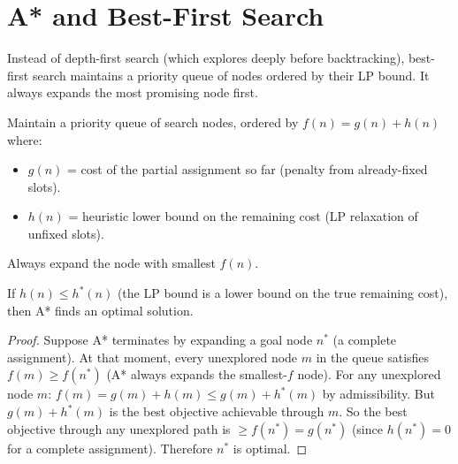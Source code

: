 \documentclass[11pt, a4paper, oneside]{book}
\begin{document}
\section{A* and Best-First Search}

Instead of depth-first search (which explores deeply before backtracking),
best-first search maintains a priority queue of nodes ordered by their LP
bound.  It always expands the most promising node first.

\begin{defbox}[title={A* for Optimisation}]
Maintain a priority queue of search nodes, ordered by
$f(n) = g(n) + h(n)$ where:
\begin{itemize}[nosep]
  \item $g(n)$ = cost of the partial assignment so far (penalty from already-fixed slots).
  \item $h(n)$ = heuristic lower bound on the remaining cost (LP relaxation of unfixed slots).
\end{itemize}
Always expand the node with smallest $f(n)$.
\end{defbox}

\begin{thmbox}[title={Admissibility of LP Heuristic}]
If $h(n) \leq h^*(n)$ (the LP bound is a lower bound on the true remaining
cost), then A* finds an optimal solution.
\end{thmbox}

\begin{proof}
Suppose A* terminates by expanding a goal node $n^*$ (a complete assignment).
At that moment, every unexplored node $m$ in the queue satisfies
$f(m) \geq f(n^*)$ (A* always expands the smallest-$f$ node).
For any unexplored node $m$: $f(m) = g(m) + h(m) \leq g(m) + h^*(m)$
by admissibility.  But $g(m) + h^*(m)$ is the best objective achievable
through $m$.  So the best objective through any unexplored path is $\geq
f(n^*) = g(n^*)$ (since $h(n^*) = 0$ for a complete assignment).
Therefore $n^*$ is optimal.
\end{proof}
\end{document}
